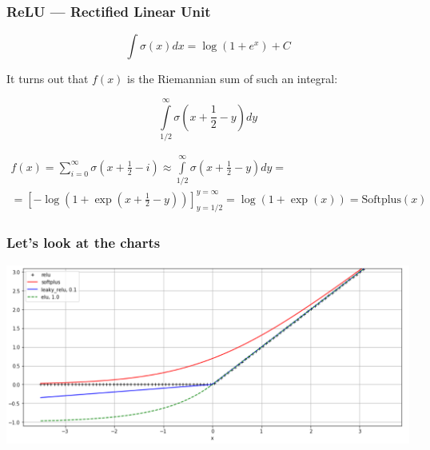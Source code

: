 \documentclass[fullscreen=true, bookmarks=true, hyperref={pdfencoding=unicode}]{beamer}
\begin{document}
\begin{frame}
  \frametitle{ReLU — Rectified Linear Unit}
  $$\int \sigma(x) dx = \log(1 + e^x) + C$$

  It turns out that $f(x)$ is the Riemannian sum of such an integral:

  $$\int\limits_{1/2}^\infty \sigma(x + \frac12 - y) dy $$

  \begin{multline*}
    f(x) = \sum\limits_{i=0}^\infty \sigma(x + \frac12 - i) \approx \int \limits_{1/2}^\infty \sigma(x + \frac12 - y) dy = \\
    = [-\log(1 + \exp(x+\frac12 - y))]_{y=1/2}^{y=\infty} = \log(1 + \exp(x)) = \text{Softplus}(x)
  \end{multline*}
\end{frame}


\begin{frame}
  \frametitle{Let's look at the charts}
  \begin{center}
    \includegraphics[keepaspectratio, width=0.9\paperwidth]{relu_softplus.png}
  \end{center}
\end{frame}
\end{document}
